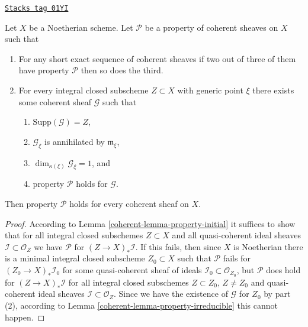 \begin{lemma}[Property]
\label{coherent-lemma-property}
\href{https://stacks.math.columbia.edu/tag/01YI}{\texttt{Stacks tag 01YI}}

Let $X$ be a Noetherian scheme.
Let $\mathcal{P}$ be a property of coherent sheaves on $X$ such that
\begin{enumerate}
\item For any short exact sequence of coherent sheaves if two
out of three of them have property $\mathcal{P}$ then so does the
third.
\item For every integral closed subscheme $Z \subset X$
with generic point $\xi$ there exists
some coherent sheaf $\mathcal{G}$ such that
\begin{enumerate}
\item $\text{Supp}(\mathcal{G}) = Z$,
\item $\mathcal{G}_\xi$ is annihilated by $\mathfrak m_\xi$,
\item $\dim_{\kappa(\xi)} \mathcal{G}_\xi = 1$, and
\item property $\mathcal{P}$ holds for $\mathcal{G}$.
\end{enumerate}
\end{enumerate}
Then property $\mathcal{P}$ holds for every coherent sheaf
on $X$.
\end{lemma}

\begin{proof}

According to Lemma \ref{coherent-lemma-property-initial} it suffices to show that
for all integral closed subschemes $Z \subset X$ and all quasi-coherent
ideal sheaves $\mathcal{I} \subset \mathcal{O}_Z$ we have $\mathcal{P}$
for $(Z \to X)_*\mathcal{I}$. If this fails, then since $X$ is Noetherian
there is a minimal integral closed subscheme $Z_0 \subset X$ such that
$\mathcal{P}$ fails for $(Z_0 \to X)_*\mathcal{I}_0$ for some
quasi-coherent sheaf of ideals $\mathcal{I}_0 \subset \mathcal{O}_{Z_0}$,
but $\mathcal{P}$ does hold for $(Z \to X)_*\mathcal{I}$ for all integral
closed subschemes $Z \subset Z_0$, $Z \not = Z_0$ and quasi-coherent
ideal sheaves $\mathcal{I} \subset \mathcal{O}_Z$. Since we have the
existence of $\mathcal{G}$ for $Z_0$ by part (2), according to
Lemma \ref{coherent-lemma-property-irreducible} this cannot happen.
\end{proof}

